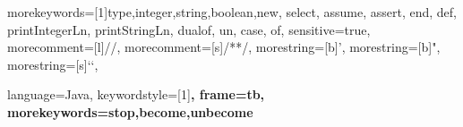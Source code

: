 %
  {morekeywords=[1]{type,integer,string,boolean,new, select, assume, assert, end, def, printIntegerLn, printStringLn, dualof, un, case, of},%
   sensitive=true,%
   morecomment=[l]{//},%
   morecomment=[s]{/*}{*/},%
   morestring=[b]',%
   morestring=[b]",%
   morestring=[s]{`}{`},%
 }
 

%
{ language=Java,
  keywordstyle=[1]\bfseries,
  frame=tb,
  morekeywords={stop,become,unbecome}
 }



\def\ContinueLineNumber{\lstset{firstnumber=last}}
\def\StartLineAt#1{\lstset{firstnumber=#1}}
\let\numberLineAt\StartLineAt

